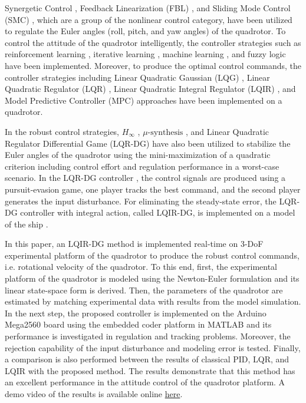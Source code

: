 \documentclass[peerreview]{IEEEtran}
\begin{document}
Synergetic Control \cite{article_Chara}, Feedback Linearization (FBL) \cite{article_Aboudonia}, and Sliding Mode Control (SMC) \cite{7007285}, which are a group of the nonlinear control category, have been utilized to regulate the Euler angles (roll, pitch, and yaw angles) of the quadrotor. To control the attitude of the quadrotor intelligently, the controller strategies such as reinforcement learning \cite{LIN2020135}, iterative learning \cite{electronics10202474}, machine learning \cite{4564736} \cite{10007918}, and fuzzy logic \cite{KIM20211888} have been implemented. Moreover, to produce the optimal control commands, the controller strategies including Linear Quadratic Gaussian (LQG) \cite{7367782}, Linear Quadratic Regulator (LQR) \cite{7064553_LQR}, Linear Quadratic Integral Regulator (LQIR) \cite{article_LQIR}, and Model Predictive Controller (MPC) approaches \cite{XUE20227992} have been implemented on a quadrotor.

In the robust control strategies, $H_{\infty}$ \cite{7081660}, $\mu\text{-synthesis}$ \cite{9395538} \cite{10057193}, and Linear Quadratic Regulator Differential Game (LQR-DG) \cite{10025263} have also been utilized to stabilize the Euler angles of the quadrotor using the mini-maximization of a quadratic criterion including control effort and regulation performance in a worst-case scenario. In the LQR-DG controller \cite{GLIZER201522}, the control signals are produced using a pursuit-evasion game, one player tracks the best command, and the second player generates the input disturbance. For eliminating the steady-state error, the LQR-DG controller with integral action, called LQIR-DG, is implemented on a model of the ship \cite{6957349}.


In this paper, an LQIR-DG method is implemented real-time on 3-DoF experimental platform of the quadrotor to produce the robust control commands, i.e. rotational velocity of the quadrotor.
To this end, first, the experimental platform of the quadrotor is modeled using the Newton-Euler formulation and its linear state-space form is derived.
Then, the parameters of the quadrotor are estimated by matching experimental data with results from the model simulation.
In the next step, the proposed controller is implemented on the Arduino Mega2560 board using the embedded coder platform in MATLAB and its performance is investigated in regulation and tracking problems.
Moreover, the rejection capability of the input disturbance and modeling error is tested.
Finally, a comparison is also performed between the results of classical PID, LQR, and LQIR with the proposed method. The results demonstrate that this method has an excellent performance in the attitude control of the quadrotor platform.
A demo video of the results is available online
\href{https://drive.google.com/drive/folders/1DIJs3wmIpmwI8slyHeitA6Ebe-khKTCt?usp=share_link}{here}.
\end{document}
